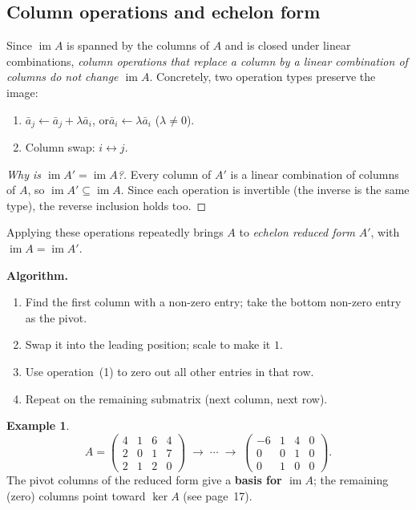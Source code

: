\documentclass[11pt]{article}
\theoremstyle{definition}
\newtheorem{example}{Example}[section]
\theoremstyle{plain}
\begin{document}
\subsection{Column operations and echelon form}

Since $\operatorname{im} A$ is spanned by the columns of $A$ and is closed under
linear combinations, \emph{column operations that replace a column by a linear
combination of columns do not change $\operatorname{im} A$}.
Concretely, two operation types preserve the image:
\begin{enumerate}
  \item $\bar{a}_j \leftarrow \bar{a}_j + \lambda\bar{a}_i$,\quad
        or\quad $\bar{a}_i \leftarrow \lambda\bar{a}_i$ \;($\lambda \neq 0$).
  \item Column swap: $i \leftrightarrow j$.
\end{enumerate}
\begin{proof}[Why is $\operatorname{im}A' = \operatorname{im}A$?]
  Every column of $A'$ is a linear combination of columns of $A$, so
  $\operatorname{im}A' \subseteq \operatorname{im}A$.  Since each operation is
  invertible (the inverse is the same type), the reverse inclusion holds too.
\end{proof}

\noindent
Applying these operations repeatedly brings $A$ to \emph{echelon reduced form}
$A'$, with $\operatorname{im}A = \operatorname{im}A'$.

\medskip\noindent
\textbf{Algorithm.}
\begin{enumerate}
  \item Find the first column with a non-zero entry; take the bottom non-zero
        entry as the pivot.
  \item Swap it into the leading position; scale to make it $1$.
  \item Use operation~(1) to zero out all other entries in that row.
  \item Repeat on the remaining submatrix (next column, next row).
\end{enumerate}

\begin{example}
\[
  A = \begin{pmatrix}4&1&6&4\\2&0&1&7\\2&1&2&0\end{pmatrix}
  \;\longrightarrow\;\cdots\;\longrightarrow\;
  \begin{pmatrix}-6&1&4&0\\0&0&1&0\\0&1&0&0\end{pmatrix}.
\]
The pivot columns of the reduced form give a \textbf{basis for $\operatorname{im}A$};
the remaining (zero) columns point toward $\ker A$ (see page~17).
\end{example}
\end{document}

